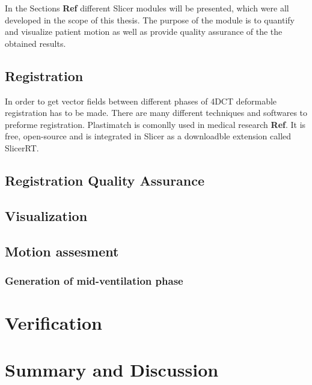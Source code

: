 \documentclass[type=dr, dr=rernat, accentcolor=tud7b,colorbacktitle, bigchapter, openright, twoside, 12pt ]{tudthesis}
\begin{document}
In the Sections \textbf{Ref} different Slicer modules will be presented, which were all developed in the scope of this thesis. The purpose of the module is to quantify and visualize patient motion as well as provide quality assurance of the the obtained results.

\subsection{Registration}

In order to get vector fields between different phases of 4DCT deformable registration has to be made. There are many different techniques and softwares to preforme registration. Plastimatch is comonlly used in medical research \textbf{Ref}. It is free, open-source and is integrated in Slicer as a downloadble extension called SlicerRT.

\subsection{Registration Quality Assurance}

\subsection{Visualization}

\subsection{Motion assesment}

\subsubsection{Generation of mid-ventilation phase}


\section{Verification}

\section{Summary and Discussion}



{}
% 
\end{document}
